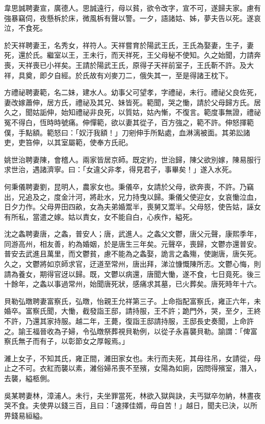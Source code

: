 \begin{pinyinscope}
韋思誠聘妻宣，廣德人。思誠遠行，母以貧，欲令改字，宣不可，遂歸夫家。慮有強暴竊伺，夜懸柝於床，微風柝有聲以警。一夕，語諸姑、姊，夢夫告以死。遂哀泣，不食死。

於天祥聘妻王，名秀女，祥符人。天祥嘗育於陽武王氏，王氏為娶妻，生子，妻死，還於氏。繼室以王，王未行，而天祥死，王父母秘不使知。久之始聞，力請奔喪，天祥喪已小祥矣。王請於陽武王氏，原得子天祥前室子，王氏靳不許。及大祥，具奠，即夕自經。於氏故有刈麥刀二，俄失其一，至是得諸王枕下。

方禮祕聘妻範，名二妹，建水人。幼事父可望孝，字禮祕，未行。禮祕父良佐死，妻改嫁蕭伸，居方氏，禮祕及其兄、妹皆死。範聞，哭之慟，請於父母歸方氏。居久之，聞姑詬伸，始知禮祕非良死，以質姑，姑內慚，不復言。範度事無證，禮祕冤不得白，恆時時號痛。伸憚範，欲以妻其從子，百方強之，範不許。伸怒揮範僕，手點額。範怒曰：「奴汙我額！」刀剜伸手所點處，血淋漓被面。其弟訟諸吏，吏笞伸，以其室屬範，使奉方氏祀。

姚世治聘妻陳，會稽人。兩家皆居京師。既定約，世治歸，陳父欲別嫁，陳易服行求世治，遇諸濟寧。曰：「女違父非孝，得見君子，事畢矣！」遂入水死。

何秉儀聘妻劉，昆明人，農家女也。秉儀卒，女請於父母，欲奔喪，不許。乃竊出，兄追及之，度金汁河，將赴水，兄力持曳以歸。秉儀父使迎女，女哀慟泣血，日夕力作。父母畀田四畝，女為夫弟婚鬻半，喪舅又鬻半。父母怒，使告姑，誣女有所私，當遣之嫁。姑以責女，女不能自白，心疾作，縊死。

沈之螽聘妻唐，之螽，普安人；唐，武進人。之螽父文鬱，唐父元聲，康熙季年，同游高州，相友善，約為婚姻，於是唐生三年矣。元聲卒，喪歸，文鬱亦還普安。普安去武進且萬里，而文鬱貧，慮不能為之螽娶，詭言之螽殤，使謝唐，唐矢死。久之，文鬱將如京師求官，迂道至常州，唐出拜，涕泣慷慨陳所志。文鬱心悔，則請為養女，期得官迓以歸。既，文鬱以病還，唐聞大慟，遂不食，七日竟死。後三十餘年，之螽以事過常州，始聞唐死狀，感痛求其墓，已火葬矣。唐死時年十六。

貝勒弘暾聘妻富察氏，弘暾，怡親王允祥第三子。上命指配富察氏，雍正六年，未婚卒。富察氏聞，大慟，截發詣王邸，請持服，王不許；跪門外，哭，至夕，王終不許，乃還其家持服。越二年，王薨，復詣王邸請持服，王邸長史奏聞，上命許之。諭王福晉收為子婦，令弘暾祭葬視貝勒例，以從子永喜襲貝勒。諭謂：「俾富察氏無子而有子，以彰節女之厚報焉。」

濰上女子，不知其氏，雍正間，濰田家女也。未行而夫死，其母往吊，女請從，母止之不可。衣紅而襲以素，濰俗婦吊喪不至殯，女陽為如廁，因問得殯室，潛入，去襲，縊柩側。

吳某聘妻林，漳浦人。未行，夫坐罪當死，林欲入獄與訣，夫丐獄卒勿納，林晝夜哭不食。夫使畀以錢三百，且曰：「速擇佳婿，毋自苦！」越日，聞夫已決，以所畀錢易絙縊。


\end{pinyinscope}
